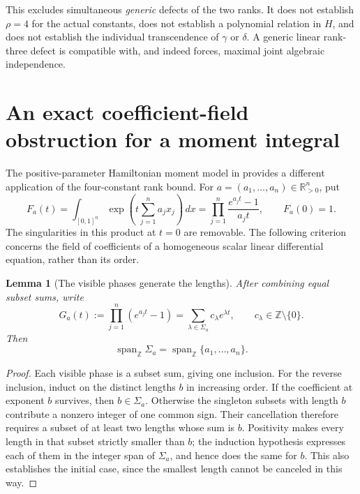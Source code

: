 \documentclass[11pt]{article}
\newtheorem{lemma}[theorem]{Lemma}
\theoremstyle{definition}
\theoremstyle{remark}
\begin{document}
This excludes simultaneous \emph{generic} defects of the two ranks. It does
not establish $\rho=4$ for the actual constants, does not establish a
polynomial relation in $H$, and does not establish the individual
transcendence of $\gamma$ or $\delta$. A generic linear rank-three defect is
compatible with, and indeed forces, maximal joint algebraic independence.
\section{An exact coefficient-field obstruction for a moment integral}
\label{sec:hamiltonian-transfer}

The positive-parameter Hamiltonian moment model in \cite{Hamiltonian}
provides a different application of the four-constant rank bound.  For
$a=(a_1,\ldots,a_n)\in\mathbb R_{>0}^n$, put
\begin{equation}\label{ham:model}
 F_a(t)=\int_{[0,1]^n}\exp\!\left(t\sum_{j=1}^n a_jx_j\right)\,dx
       =\prod_{j=1}^n\frac{e^{a_jt}-1}{a_jt},\qquad F_a(0)=1.
\end{equation}
The singularities in this product at $t=0$ are removable.  The following
criterion concerns the field of coefficients of a homogeneous scalar
linear differential equation, rather than its order.

\begin{lemma}[The visible phases generate the lengths]\label{ham:span}
After combining equal subset sums, write
\[
 G_a(t):=\prod_{j=1}^n(e^{a_jt}-1)
       =\sum_{\lambda\in\Sigma_a}c_\lambda e^{\lambda t},
 \qquad c_\lambda\in\mathbb Z\setminus\{0\}.
\]
Then
\[
 \operatorname{span}_{\mathbb Z}\Sigma_a
 =\operatorname{span}_{\mathbb Z}\{a_1,\ldots,a_n\}.
\]
\end{lemma}
\begin{proof}
Each visible phase is a subset sum, giving one inclusion.  For the
reverse inclusion, induct on the distinct lengths $b$ in increasing
order.  If the coefficient at exponent $b$ survives, then $b\in\Sigma_a$.
Otherwise the singleton subsets with length $b$ contribute a nonzero
integer of one common sign.  Their cancellation therefore requires a
subset of at least two lengths whose sum is $b$.  Positivity makes every
length in that subset strictly smaller than $b$; the induction hypothesis
expresses each of them in the integer span of $\Sigma_a$, and hence does
the same for $b$.  This also establishes the initial case, since the
smallest length cannot be canceled in this way.
\end{proof}
\end{document}
